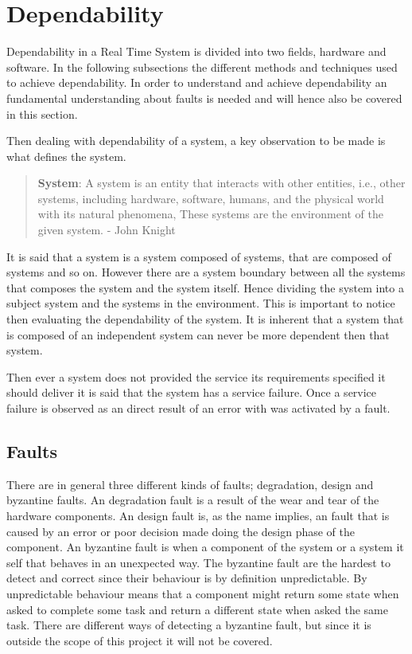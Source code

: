 \section{Dependability}
Dependability in a Real Time System is divided into two fields, hardware and software. 
In the following subsections the different methods and techniques used to achieve dependability.  
In order to understand and achieve dependability an fundamental understanding about faults is needed and will hence also be covered in this section.

Then dealing with dependability of a system, a key observation to be made is what defines the system. 
\begin{quote}
\textbf{System}: A system is an entity that interacts with other entities, i.e., other systems, including hardware, software, humans, and the physical world with its natural phenomena, These systems are the environment of the given system. - John Knight \cite{FundementalsOfDependableComputingForSoftwareEngineers}
\end{quote}
It is said that a system is a system composed of systems, that are composed of systems and so on. 
However there are a system boundary between all the systems that composes the system and the system itself. 
Hence dividing the system into a subject system and the systems in the environment. 
This is important to notice then evaluating the dependability of the system. 
It is inherent that a system that is composed of an independent system can never be more dependent then that system. 

Then ever a system does not provided the service its requirements specified it should deliver it is said that the system has a service failure. 
Once a service failure is observed as an direct result of an error with was activated by a fault. 

\subsection{Faults}
There are in general three different kinds of faults; degradation, design and byzantine faults. 
An degradation fault is a result of the wear and tear of the hardware components.
An design fault is, as the name implies, an fault that is caused by an error or poor decision made doing the design phase of the component. 
An byzantine fault is when a component of the system or a system it self that behaves in an unexpected way. 
The byzantine fault are the hardest to detect and correct since their behaviour is by definition unpredictable. 
By unpredictable behaviour means that a component might return some state when asked to complete some task and return a different state when asked the same task. 
There are different ways of detecting a byzantine fault, but since it is outside the scope of this project it will not be covered. 

